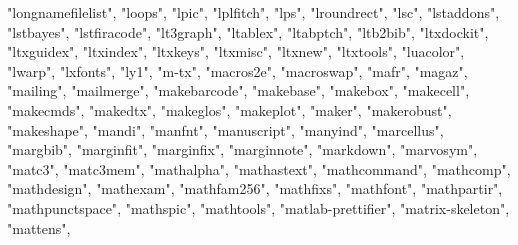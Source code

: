\documentclass[
]{article}
\newenvironment{Shaded}{\begin{snugshade}}{\end{snugshade}}
\newcommand{\NormalTok}[1]{#1}
\newcommand{\StringTok}[1]{\textcolor[rgb]{0.31,0.60,0.02}{#1}}
\begin{document}
\begin{Shaded}
\begin{Highlighting}[]
\StringTok{"longnamefilelist"}\NormalTok{, }\StringTok{"loops"}\NormalTok{, }\StringTok{"lpic"}\NormalTok{, }\StringTok{"lplfitch"}\NormalTok{, }\StringTok{"lps"}\NormalTok{, }\StringTok{"lroundrect"}\NormalTok{, }
\StringTok{"lsc"}\NormalTok{, }\StringTok{"lstaddons"}\NormalTok{, }\StringTok{"lstbayes"}\NormalTok{, }\StringTok{"lstfiracode"}\NormalTok{, }\StringTok{"lt3graph"}\NormalTok{, }\StringTok{"ltablex"}\NormalTok{, }
\StringTok{"ltabptch"}\NormalTok{, }\StringTok{"ltb2bib"}\NormalTok{, }\StringTok{"ltxdockit"}\NormalTok{, }\StringTok{"ltxguidex"}\NormalTok{, }\StringTok{"ltxindex"}\NormalTok{, }
\StringTok{"ltxkeys"}\NormalTok{, }\StringTok{"ltxmisc"}\NormalTok{, }\StringTok{"ltxnew"}\NormalTok{, }\StringTok{"ltxtools"}\NormalTok{, }\StringTok{"luacolor"}\NormalTok{, }\StringTok{"lwarp"}\NormalTok{, }
\StringTok{"lxfonts"}\NormalTok{, }\StringTok{"ly1"}\NormalTok{, }\StringTok{"m{-}tx"}\NormalTok{, }\StringTok{"macros2e"}\NormalTok{, }\StringTok{"macroswap"}\NormalTok{, }\StringTok{"mafr"}\NormalTok{, }\StringTok{"magaz"}\NormalTok{, }
\StringTok{"mailing"}\NormalTok{, }\StringTok{"mailmerge"}\NormalTok{, }\StringTok{"makebarcode"}\NormalTok{, }\StringTok{"makebase"}\NormalTok{, }\StringTok{"makebox"}\NormalTok{, }
\StringTok{"makecell"}\NormalTok{, }\StringTok{"makecmds"}\NormalTok{, }\StringTok{"makedtx"}\NormalTok{, }\StringTok{"makeglos"}\NormalTok{, }\StringTok{"makeplot"}\NormalTok{, }\StringTok{"maker"}\NormalTok{, }
\StringTok{"makerobust"}\NormalTok{, }\StringTok{"makeshape"}\NormalTok{, }\StringTok{"mandi"}\NormalTok{, }\StringTok{"manfnt"}\NormalTok{, }\StringTok{"manuscript"}\NormalTok{, }\StringTok{"manyind"}\NormalTok{, }
\StringTok{"marcellus"}\NormalTok{, }\StringTok{"margbib"}\NormalTok{, }\StringTok{"marginfit"}\NormalTok{, }\StringTok{"marginfix"}\NormalTok{, }\StringTok{"marginnote"}\NormalTok{, }
\StringTok{"markdown"}\NormalTok{, }\StringTok{"marvosym"}\NormalTok{, }\StringTok{"matc3"}\NormalTok{, }\StringTok{"matc3mem"}\NormalTok{, }\StringTok{"mathalpha"}\NormalTok{, }\StringTok{"mathastext"}\NormalTok{, }
\StringTok{"mathcommand"}\NormalTok{, }\StringTok{"mathcomp"}\NormalTok{, }\StringTok{"mathdesign"}\NormalTok{, }\StringTok{"mathexam"}\NormalTok{, }\StringTok{"mathfam256"}\NormalTok{, }
\StringTok{"mathfixs"}\NormalTok{, }\StringTok{"mathfont"}\NormalTok{, }\StringTok{"mathpartir"}\NormalTok{, }\StringTok{"mathpunctspace"}\NormalTok{, }\StringTok{"mathspic"}\NormalTok{, }
\StringTok{"mathtools"}\NormalTok{, }\StringTok{"matlab{-}prettifier"}\NormalTok{, }\StringTok{"matrix{-}skeleton"}\NormalTok{, }\StringTok{"mattens"}\NormalTok{, }

\end{Highlighting}
\end{Shaded}
\end{document}
